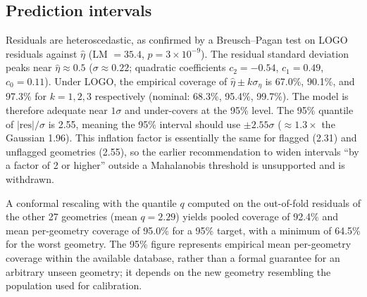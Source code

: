 \documentclass[12pt]{article}
\begin{document}
\subsection{Prediction intervals}
Residuals are heteroscedastic, as confirmed by a Breusch--Pagan test on LOGO residuals against $\hat\eta$ (LM $= 35.4$, $p = 3\times10^{-9}$). The residual standard deviation peaks near $\hat\eta \approx 0.5$ ($\sigma \approx 0.22$; quadratic coefficients $c_2 = -0.54$, $c_1 = 0.49$, $c_0 = 0.11$). Under LOGO, the empirical coverage of $\hat\eta \pm k\sigma_\eta$ is 67.0\%, 90.1\%, and 97.3\% for $k = 1, 2, 3$ respectively (nominal: 68.3\%, 95.4\%, 99.7\%). The model is therefore adequate near $1\sigma$ and under-covers at the 95\% level. The 95\% quantile of $|\text{res}|/\sigma$ is 2.55, meaning the 95\% interval should use $\pm 2.55\sigma$ ($\approx 1.3\times$ the Gaussian 1.96). This inflation factor is essentially the same for flagged (2.31) and unflagged geometries (2.55), so the earlier recommendation to widen intervals ``by a factor of 2 or higher'' outside a Mahalanobis threshold is unsupported and is withdrawn.

A conformal rescaling with the quantile $q$ computed on the out-of-fold residuals of the other 27 geometries (mean $q = 2.29$) yields pooled coverage of 92.4\% and mean per-geometry coverage of 95.0\% for a 95\% target, with a minimum of 64.5\% for the worst geometry. The 95\% figure represents empirical mean per-geometry coverage within the available database, rather than a formal guarantee for an arbitrary unseen geometry; it depends on the new geometry resembling the population used for calibration.
\end{document}
